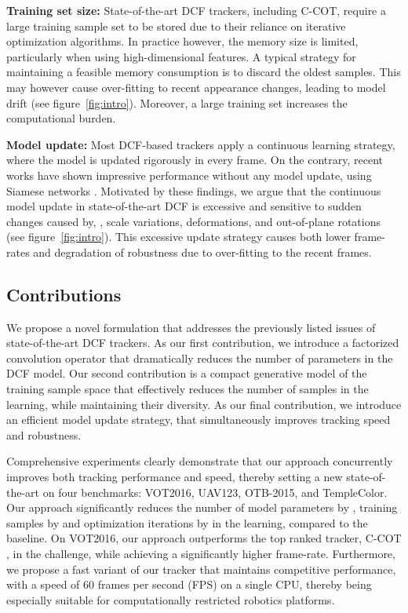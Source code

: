 \documentclass[10pt,twocolumn,letterpaper]{article}
\newcommand{\parsection}[1]{\noindent\textbf{#1:}}
\begin{document}
\parsection{Training set size}
State-of-the-art DCF trackers, including C-COT, require a large training sample set to be stored due to their reliance on iterative optimization algorithms. In practice however, the memory size is limited, particularly when using high-dimensional features. A typical strategy for maintaining a feasible memory consumption is to discard the oldest samples. This may however cause over-fitting to recent appearance changes, leading to model drift (see figure~\ref{fig:intro}). Moreover, a large training set increases the computational burden.

\parsection{Model update}
Most DCF-based trackers apply a continuous learning strategy, where the model is updated rigorously in every frame. On the contrary, recent works have shown impressive performance without any model update, using Siamese networks \cite{SiameseFC}. Motivated by these findings, we argue that the continuous model update in state-of-the-art DCF is excessive and sensitive to sudden changes caused by, \eg, scale variations, deformations, and out-of-plane rotations (see figure~\ref{fig:intro}). This excessive update strategy causes both lower frame-rates and degradation of robustness due to over-fitting to the recent frames.

\subsection{Contributions}
We propose a novel formulation that addresses the previously listed issues of state-of-the-art DCF trackers. As our first contribution, we introduce a factorized convolution operator that dramatically reduces the number of parameters in the DCF model. Our second contribution is a compact generative model of the training sample space that effectively reduces the number of samples in the learning, while maintaining their diversity. As our final contribution, we introduce an efficient model update strategy, that simultaneously improves tracking speed and robustness. 

Comprehensive experiments clearly demonstrate that our approach concurrently improves both tracking performance and speed, thereby setting a new state-of-the-art on four benchmarks: VOT2016, UAV123, OTB-2015, and TempleColor. Our approach significantly reduces the number of model parameters by , training samples by  and optimization iterations by  in the learning, compared to the baseline. On VOT2016, our approach outperforms the top ranked tracker, C-COT \cite{DanelljanECCV2016}, in the challenge, while achieving a significantly higher frame-rate. Furthermore, we propose a fast variant of our tracker that maintains competitive performance, with a speed of 60 frames per second (FPS) on a single CPU, thereby being especially suitable for computationally restricted robotics platforms. 
\end{document}
